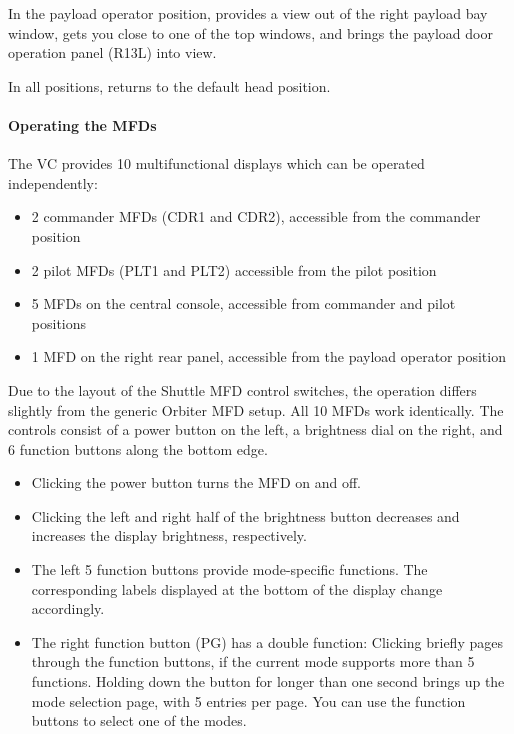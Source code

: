 \documentclass[Orbiter User Manual.tex]{subfiles}
\begin{document}
In the payload operator position, \keystroke{\ctrl,\alt,\rarrow} provides a view
out of the right payload bay window, \keystroke{\ctrl,\alt,\uarrow} gets you
close to one of the top windows, and \keystroke{\ctrl,\alt,\larrow} brings the
payload door operation panel (R13L) into view.

In all positions, \keystroke{\ctrl,\alt,\darrow} returns to the default head
position.

\paragraph{Operating the MFDs}
The VC provides 10 multifunctional displays which can be operated independently:
\begin{itemize}
	\item 2 commander MFDs (CDR1 and CDR2), accessible from the commander
		position
	\item 2 pilot MFDs (PLT1 and PLT2) accessible from the pilot position
	\item 5 MFDs on the central console, accessible from commander and pilot
		positions
	\item 1 MFD on the right rear panel, accessible from the payload operator
		position
\end{itemize}

Due to the layout of the Shuttle MFD control switches, the operation differs
slightly from the generic Orbiter MFD setup. All 10 MFDs work identically. The
controls consist of a power button on the left, a brightness dial on the right,
and 6 function buttons along the bottom edge.

\begin{itemize}
	\item Clicking the power button turns the MFD on and off.
	\item Clicking the left and right half of the brightness button decreases
		and increases the display brightness, respectively.
	\item The left 5 function buttons provide mode-specific functions. The
		corresponding labels displayed at the bottom of the display change
		accordingly.
	\item The right function button (PG) has a double function: Clicking briefly
		pages through the function buttons, if the current mode supports more
		than 5 functions. Holding down the button for longer than one second
		brings up the mode selection page, with 5 entries per page. You can use
		the function buttons to select one of the modes.
\end{itemize}
\end{document}
